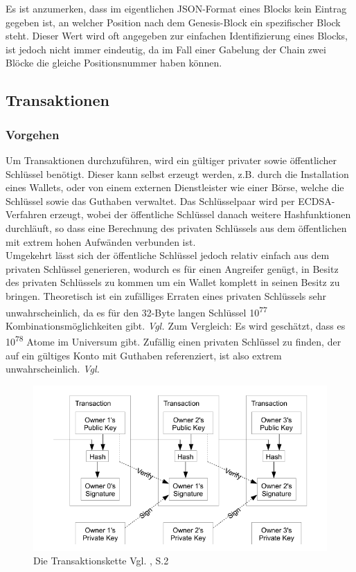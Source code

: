 Es ist anzumerken, dass im eigentlichen JSON-Format eines Blocks kein Eintrag gegeben ist, an welcher Position nach dem Genesis-Block ein spezifischer Block steht. Dieser Wert wird oft angegeben zur einfachen Identifizierung eines Blocks, ist jedoch nicht immer eindeutig, da im Fall einer Gabelung der Chain zwei Blöcke die gleiche Positionsnummer haben können.

\subsection{Transaktionen}
\subsubsection{Vorgehen}
Um Transaktionen durchzuführen, wird ein gültiger privater sowie öffentlicher Schlüssel benötigt. Dieser kann selbst erzeugt werden, z.B. durch die Installation eines Wallets, oder von einem externen Dienstleister wie einer Börse, welche die Schlüssel sowie das Guthaben verwaltet. Das Schlüsselpaar wird per ECDSA-Verfahren erzeugt, wobei der öffentliche Schlüssel danach weitere Hashfunktionen durchläuft, so dass eine Berechnung des privaten Schlüssels aus dem öffentlichen mit extrem hohen Aufwänden verbunden ist. \\
Umgekehrt lässt sich der öffentliche Schlüssel jedoch relativ einfach aus dem privaten Schlüssel generieren, wodurch es für einen Angreifer genügt, in Besitz des privaten Schlüssels zu kommen um ein Wallet komplett in seinen Besitz zu bringen. Theoretisch ist ein zufälliges Erraten eines privaten Schlüssels sehr unwahrscheinlich, da es für den 32-Byte langen Schlüssel 10\textsuperscript{77} Kombinationsmöglichkeiten gibt. \textit{Vgl. \cite{Antonopoulos.2015}} 
Zum Vergleich: Es wird geschätzt, dass es 10\textsuperscript{78} Atome im Universum gibt. Zufällig einen privaten Schlüssel zu finden, der auf ein gültiges Konto mit Guthaben referenziert, ist also extrem unwahrscheinlich. \textit{Vgl. \citet{UniversitatFrankfurt.2016}}\\


\begin{figure}[ht]
	\centering
	\includegraphics[scale=0.75]{grafiken/Blockchain_Transaktionen.png}
	\caption{Die Transaktionskette Vgl. \citet{Nakamoto.2008}, S.2}
	\label{Transaktionskette}
\end{figure}


